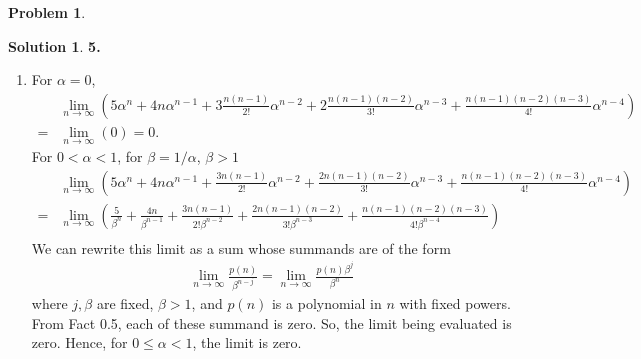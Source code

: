 \documentclass{book}
\theoremstyle{definition}
\newtheorem*{prob*}{Problem}
\newtheorem*{sln*}{Solution}
\begin{document}
\begin{prob*}
	\begin{sln*}\textbf{5. }
		\begin{enumerate}
			\item For $\alpha = 0$, 
			\begin{align*}
			&\lim\limits_{n\to \infty} \left(    5\alpha^n + 4n\alpha^{n-1} + 3\frac{n(n-1)}{2!}\alpha^{n-2} + 2\frac{n(n-1)(n-2)}{3!}\alpha^{n-3}  + \frac{n(n-1)(n-2)(n-3)}{4!}\alpha^{n-4} \right) \\
			= &\lim\limits_{n\to\infty}(0) = 0.
			\end{align*}
			For $0 < \alpha < 1$, for $\beta = 1/\alpha$, $\beta > 1$
			\begin{align*}
			&\lim\limits_{n\to \infty} \left(    5\alpha^n + 4n\alpha^{n-1} + \frac{3n(n-1)}{2!}\alpha^{n-2} + \frac{2n(n-1)(n-2)}{3!}\alpha^{n-3}  + \frac{n(n-1)(n-2)(n-3)}{4!}\alpha^{n-4} \right)\\
			= &\lim\limits_{n\to\infty}\left(    \frac{5}{\beta^n} + \frac{4n}{\beta^{n-1}} + \frac{3n(n-1)}{2!\beta^{n-2}} + \frac{2n(n-1)(n-2)}{3!\beta^{n-3}}  + \frac{n(n-1)(n-2)(n-3)}{4!\beta^{n-4}} \right) \\
			\end{align*}
			We can rewrite this limit as a sum whose summands are of the form
			\begin{align*}
			\lim\limits_{n\to\infty}\frac{p(n)}{\beta^{n-j}} = \lim\limits_{n\to\infty}\frac{p(n)\beta^{j}}{\beta^{n}}
			\end{align*}
			where $j, \beta$ are fixed, $\beta>1$, and $p(n)$ is a polynomial in $n$ with fixed powers. From Fact 0.5, each of these summand is zero. So, the limit being evaluated is zero. Hence, for $0\leq \alpha < 1$, the limit is zero. \\
			

\end{enumerate}
\end{sln*}
\end{prob*}
\end{document}
